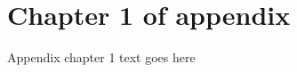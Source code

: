\documentclass[phd,tocprelim]{cornell}
\begin{document}


\appendix
\chapter{Chapter 1 of appendix}
Appendix chapter 1 text goes here


\end{document}
